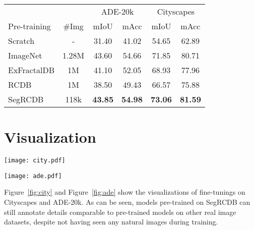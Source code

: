 \documentclass[10pt,twocolumn,letterpaper]{article}
\begin{document}
\begin{table*}[t]
\begin{center}
 \caption{Comparison with backbone pre-training. This represents the result of fine-tuning ImageNet with a learning rate of 0.001 as other classification datasets.} 
    \begin{tabular}{lccccc}
      \toprule
        &  &\multicolumn{2}{c}{ADE-20k} & \multicolumn{2}{c}{Cityscapes} \\
        Pre-training & \#Img &  mIoU & mAcc & mIoU & mAcc \\
        \bottomrule[0.5pt]
        Scratch & -& 31.40 & 41.02 & 54.65 & 62.89 \\
        ImageNet& 1.28M & 43.60& 54.66 &   71.85& 80.71 \\
        ExFractalDB&1M&  41.10 & 52.05  & 68.93 & 77.96\\
        RCDB&1M &  38.50 & 49.43 &  66.57 & 75.88  \\
        SegRCDB&118k & \textbf{43.85} & \textbf{54.98} & \textbf{73.06} & \textbf{81.59}    \\
        \bottomrule[0.8pt]
 \end{tabular}
\label{learningrate_backbone}
\end{center}
\vspace{-10pt}
\end{table*}

\section{Visualization}
\begin{figure*}
\centering
\texttt{[image: city.pdf]}
\caption{Visual comparison of fine-tuning result on Cityscapes. The first low represents the input images, and the second row represents the ground truth. An enlarged detail of the image is attached on the right. SegRCDB used 118k images. }
\label{fig:city}
\vspace{-15pt}
\end{figure*}

\begin{figure*}
\centering
\texttt{[image: ade.pdf]}
\caption{Visual comparison of fine-tuning result on ADE-20k. The first low represents the input images, and the second row represents the ground truth. An enlarged detail of the image is attached on the right. SegRCDB used 118k images. }
\label{fig:ade}
\vspace{-15pt}
\end{figure*}

\label{sec:visualization}
Figure~\ref{fig:city} and Figure~\ref{fig:ade} show the visualizations of fine-tunings on Cityscapes and ADE-20k. As can be seen, models pre-trained on SegRCDB can still annotate details comparable to pre-trained models on other real image datasets, despite not having seen any natural images during training. 
\end{document}
